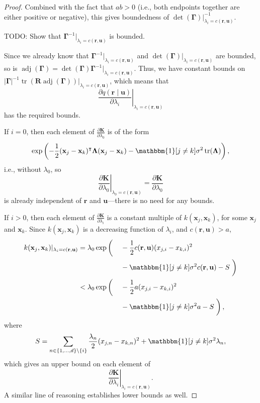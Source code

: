 \documentclass{mpaper}
\DeclareMathOperator{\adj}{adj}
\DeclareMathOperator{\tr}{tr}
\begin{document}
\begin{proof}
  Combined with the fact that $ab > 0$ (i.e., both endpoints together are either
  positive or negative), this gives boundedness of $\det(\bm\Gamma)|_{\lambda_i
    = c(\mathbf{r}, \mathbf{u})}^{-1}$.

  TODO: Show that $\bm\Gamma^{-1}|_{\lambda_i = c(\mathbf{r}, \mathbf{u})}$ is
  bounded.

  Since we already know that $\bm\Gamma^{-1}|_{\lambda_i = c(\mathbf{r},
    \mathbf{u})}$ and $\det(\bm\Gamma)|_{\lambda_i = c(\mathbf{r}, \mathbf{u})}$
  are bounded, so is $\adj(\bm\Gamma) =
  \det(\bm\Gamma)\bm\Gamma^{-1}|_{\lambda_i = c(\mathbf{r}, \mathbf{u})}$. Thus,
  we have constant bounds on
  $|\bm\Gamma|^{-1}\tr(\mathbf{R}\adj(\bm\Gamma))|_{\lambda_i = c(\mathbf{r},
    \mathbf{u})}$, which means that
  \[
    \left. \frac{\partial q(\mathbf{r} \mid \mathbf{u})}{\partial \lambda_i}
    \right|_{\lambda_i = c(\mathbf{r}, \mathbf{u})}
  \]
  has the required bounds.

  If $i = 0$, then each element of $\frac{\partial \mathbf{K}}{\partial
    \lambda_0}$ is of the form
  \[
    \exp \left( -\frac{1}{2}(\mathbf{x}_j - \mathbf{x}_k)^\intercal
      \bm\Lambda (\mathbf{x}_j - \mathbf{x}_k) - \mathbbm{1}[j \ne
      k]\sigma^2\tr(\bm\Lambda) \right),
  \]
  i.e., without $\lambda_0$, so
  \[
    \left. \frac{\partial \mathbf{K}}{\partial \lambda_0} \right|_{\lambda_0 =
      c(\mathbf{r}, \mathbf{u})} = \frac{\partial \mathbf{K}}{\partial
      \lambda_0}
  \]
  is already independent of $\mathbf{r}$ and $\mathbf{u}$---there is no need
  for any bounds.

  If $i > 0$, then each element of $\frac{\partial \mathbf{K}}{\partial
    \lambda_i}$ is a constant multiple of $k(\mathbf{x}_j,
  \mathbf{x}_k)$, for some $\mathbf{x}_j$ and $\mathbf{x}_k$. Since
  $k(\mathbf{x}_j, \mathbf{x}_k)$ is a decreasing function of
  $\lambda_i$, and $c(\mathbf{r}, \mathbf{u}) > a$,
  \begin{alignat*}{3}
    k(\mathbf{x}_j, \mathbf{x}_k)|_{\lambda_i = c(\mathbf{r},
      \mathbf{u})} &= \lambda_0 \exp \left( \vphantom{\frac{1}{2}} \right. &&
    -\frac{1}{2} c(\mathbf{r}, \mathbf{u})(x_{j,i} - x_{k,i})^2 \\
    & && - \mathbbm{1}[j \ne k]\sigma^2c(\mathbf{r}, \mathbf{u}) - S \left.
      \vphantom{\frac{1}{2}} \right) \\
    &< \lambda_0 \exp \left( \vphantom{\frac{1}{2}} \right. && -\frac{1}{2}
    a(x_{j,i} - x_{k,i})^2 \\
    & && - \mathbbm{1}[j \ne k]\sigma^2a - S \left. \vphantom{\frac{1}{2}}
    \right),
  \end{alignat*}
  where
  \[
    S = \sum_{n \in \{ 1, \dots, d \} \setminus \{ i \}} \frac{\lambda_n}{2}
    (x_{j,n} - x_{k,n})^2 + \mathbbm{1}[j \ne k]\sigma^2 \lambda_n,
  \]
  which gives an upper bound on each element of
  \[
    \left. \frac{\partial \mathbf{K}}{\partial \lambda_i} \right|_{\lambda_i =
      c(\mathbf{r}, \mathbf{u})}.
  \]
  A similar line of reasoning establishes lower bounds as well.


\end{proof}
\end{document}
